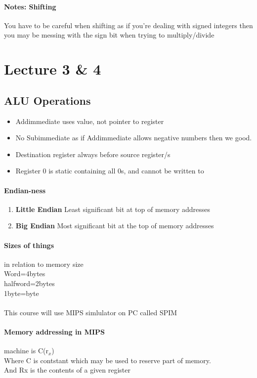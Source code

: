 \documentclass{article}
\newcommand\tab[1][0.5cm]{\hspace*{#1}}
\begin{document}
		\paragraph{Notes: Shifting} You have to be careful when shifting as if you're dealing with signed integers then you may be messing with the sign bit when trying to multiply/divide	


\section{Lecture 3 \& 4}
	\subsection{ALU Operations}
		\begin{itemize}
			\item Addimmediate uses value, not pointer to register
			\item No Subimmediate as if Addimmediate allows negative numbers then we good.
			\item Destination register always before source register/s
			\item Register 0 is static containing all 0s, and cannot be written to
		\end{itemize}

		\paragraph{Endian-ness}
		\begin{enumerate}
			\item \textbf{Little Endian} Least significant bit at top of memory addresses
			\item \textbf{Big Endian} Most significant bit at the top of memory addresses
		\end{enumerate}

		\paragraph{Sizes of things} in relation to memory size \\ \tab Word=4bytes \\ 
		\tab halfword=2bytes \\ 
		\tab 1byte=byte\\ \\
		This course will use MIPS simlulator on PC called SPIM

		\paragraph{Memory addressing in MIPS} machine is C(r$_x$)
			\\ \tab Where C is contstant which may be used to reserve part of memory. 
			\\ \tab And Rx is the contents of a given register
\end{document}
